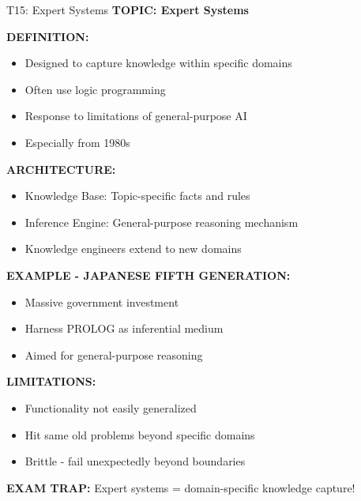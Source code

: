 \documentclass[8pt]{beamer}
\begin{document}
	\begin{frame}{T15: Expert Systems}
		\fontsize{6.5}{7.5}\selectfont
		\textbf{TOPIC: Expert Systems}
		
		\vspace{0.1cm}
		\textbf{DEFINITION:}
		\begin{itemize}
			\item Designed to capture knowledge within specific domains
			\item Often use logic programming
			\item Response to limitations of general-purpose AI
			\item Especially from 1980s
		\end{itemize}
		
		\vspace{0.1cm}
		\textbf{ARCHITECTURE:}
		\begin{itemize}
			\item \textcolor{myblue}{Knowledge Base:} Topic-specific facts and rules
			\item \textcolor{myblue}{Inference Engine:} General-purpose reasoning mechanism
			\item Knowledge engineers extend to new domains
		\end{itemize}
		
		\vspace{0.1cm}
		\textbf{EXAMPLE - JAPANESE FIFTH GENERATION:}
		\begin{itemize}
			\item Massive government investment
			\item Harness PROLOG as inferential medium
			\item Aimed for general-purpose reasoning
		\end{itemize}
		
		\vspace{0.1cm}
		\textbf{LIMITATIONS:}
		\begin{itemize}
			\item Functionality not easily generalized
			\item Hit same old problems beyond specific domains
			\item Brittle - fail unexpectedly beyond boundaries
		\end{itemize}
		
		\textcolor{myred}{\textbf{EXAM TRAP:}} Expert systems = \textcolor{myblue}{domain-specific knowledge capture}!
	\end{frame}
	
	
\end{document}
